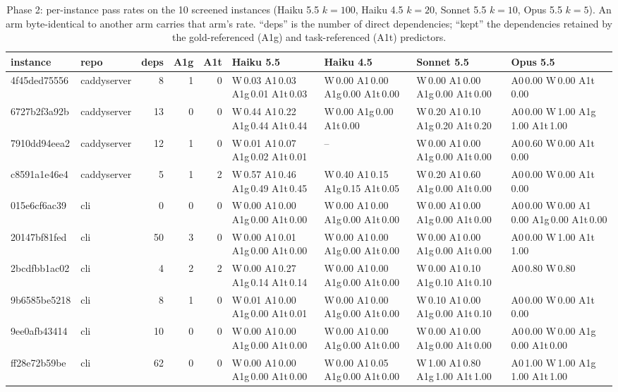 \begin{table}[t]\centering\footnotesize
\caption{Phase 2: per-instance pass rates on the 10 screened instances (Haiku 5.5 $k{=}100$, Haiku 4.5 $k{=}20$, Sonnet 5.5 $k{=}10$, Opus 5.5 $k{=}5$). An arm byte-identical to another arm carries that arm's rate. ``deps'' is the number of direct dependencies; ``kept'' the dependencies retained by the gold-referenced (A1g) and task-referenced (A1t) predictors.}\label{tab:p2inst}
\begin{tabular}{llrrr p{3.1cm} p{2.9cm} p{2.9cm} p{2.6cm}}\toprule
instance & repo & deps & A1g & A1t & Haiku 5.5 & Haiku 4.5 & Sonnet 5.5 & Opus 5.5\\\midrule
4f45ded75556 & caddyserver & 8 & 1 & 0 & W\,0.03 A1\,0.03 A1g\,0.01 A1t\,0.03 & W\,0.00 A1\,0.00 A1g\,0.00 A1t\,0.00 & W\,0.00 A1\,0.00 A1g\,0.00 A1t\,0.00 & A0\,0.00 W\,0.00 A1t\,0.00\\
6727b2f3a92b & caddyserver & 13 & 0 & 0 & W\,0.44 A1\,0.22 A1g\,0.44 A1t\,0.44 & W\,0.00 A1g\,0.00 A1t\,0.00 & W\,0.20 A1\,0.10 A1g\,0.20 A1t\,0.20 & A0\,0.00 W\,1.00 A1g\,1.00 A1t\,1.00\\
7910dd94eea2 & caddyserver & 12 & 1 & 0 & W\,0.01 A1\,0.07 A1g\,0.02 A1t\,0.01 & -- & W\,0.00 A1\,0.00 A1g\,0.00 A1t\,0.00 & A0\,0.60 W\,0.00 A1t\,0.00\\
c8591a1e46e4 & caddyserver & 5 & 1 & 2 & W\,0.57 A1\,0.46 A1g\,0.49 A1t\,0.45 & W\,0.40 A1\,0.15 A1g\,0.15 A1t\,0.05 & W\,0.20 A1\,0.60 A1g\,0.00 A1t\,0.00 & A0\,0.00 W\,0.00 A1t\,0.00\\
015e6cf6ac39 & cli & 0 & 0 & 0 & W\,0.00 A1\,0.00 A1g\,0.00 A1t\,0.00 & W\,0.00 A1\,0.00 A1g\,0.00 A1t\,0.00 & W\,0.00 A1\,0.00 A1g\,0.00 A1t\,0.00 & A0\,0.00 W\,0.00 A1\,0.00 A1g\,0.00 A1t\,0.00\\
20147bf81fed & cli & 50 & 3 & 0 & W\,0.00 A1\,0.01 A1g\,0.00 A1t\,0.00 & W\,0.00 A1\,0.00 A1g\,0.00 A1t\,0.00 & W\,0.00 A1\,0.00 A1g\,0.00 A1t\,0.00 & A0\,0.00 W\,1.00 A1t\,1.00\\
2bcdfbb1ac02 & cli & 4 & 2 & 2 & W\,0.00 A1\,0.27 A1g\,0.14 A1t\,0.14 & W\,0.00 A1\,0.00 A1g\,0.00 A1t\,0.00 & W\,0.00 A1\,0.10 A1g\,0.10 A1t\,0.10 & A0\,0.80 W\,0.80\\
9b6585be5218 & cli & 8 & 1 & 0 & W\,0.01 A1\,0.00 A1g\,0.00 A1t\,0.01 & W\,0.00 A1\,0.00 A1g\,0.00 A1t\,0.00 & W\,0.10 A1\,0.00 A1g\,0.00 A1t\,0.10 & A0\,0.00 W\,0.00 A1t\,0.00\\
9ee0afb43414 & cli & 10 & 0 & 0 & W\,0.00 A1\,0.00 A1g\,0.00 A1t\,0.00 & W\,0.00 A1\,0.00 A1g\,0.00 A1t\,0.00 & W\,0.00 A1\,0.00 A1g\,0.00 A1t\,0.00 & A0\,0.00 W\,0.00 A1g\,0.00 A1t\,0.00\\
ff28e72b59be & cli & 62 & 0 & 0 & W\,0.00 A1\,0.00 A1g\,0.00 A1t\,0.00 & W\,0.00 A1\,0.05 A1g\,0.00 A1t\,0.00 & W\,1.00 A1\,0.80 A1g\,1.00 A1t\,1.00 & A0\,1.00 W\,1.00 A1g\,1.00 A1t\,1.00\\
\bottomrule\end{tabular}\end{table}


